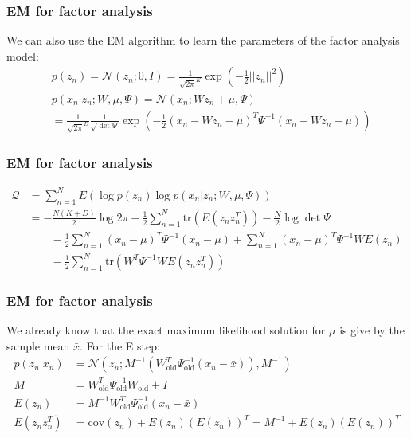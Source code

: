 \documentclass{beamer}
\begin{document}
\begin{frame}
    \frametitle{EM for factor analysis}
    We can also use the EM algorithm to learn the parameters of the factor analysis model:
    \begin{align*}
        &p(z_{n})=\mathcal{N}(z_{n};0,I)=\frac{1}{\sqrt{2\pi}^{K}}\exp(-\frac{1}{2}||z_{n}||^{2}) \\
        &p(x_{n}|z_{n};W,\mu,\Psi)=\mathcal{N}(x_{n};Wz_{n}+\mu,\Psi) \\
        &=\frac{1}{\sqrt{2\pi}^{D}}\frac{1}{\sqrt{\det\Psi}}\exp(-\frac{1}{2}(x_{n}-Wz_{n}-\mu)^{T}\Psi^{-1}(x_{n}-Wz_{n}-\mu))
    \end{align*}
\end{frame}

\begin{frame}
    \frametitle{EM for factor analysis}
    \begin{align*}
        \mathcal{Q}&=\sum_{n=1}^{N}E(\log{}p(z_{n})\log{}p(x_{n}|z_{n};W,\mu,\Psi)) \\
        &=-\frac{N(K+D)}{2}\log{}2\pi-\frac{1}{2}\sum_{n=1}^{N}\mathrm{tr}(E(z_{n}z_{n}^{T}))-\frac{N}{2}\log\det\Psi \\
        &\qquad-\frac{1}{2}\sum_{n=1}^{N}(x_{n}-\mu)^{T}\Psi^{-1}(x_{n}-\mu)+\sum_{n=1}^{N}(x_{n}-\mu)^{T}\Psi^{-1}WE(z_{n}) \\
        &\qquad-\frac{1}{2}\sum_{n=1}^{N}\mathrm{tr}(W^{T}\Psi^{-1}WE(z_{n}z_{n}^{T}))
    \end{align*}
\end{frame}

\begin{frame}
    \frametitle{EM for factor analysis}
    We already know that the exact maximum likelihood solution for $\mu$ is give by the sample mean $\bar{x}$. For the E step:
    \begin{align*}
        p(z_{n}|x_{n})&=\mathcal{N}(z_{n};M^{-1}(W^{T}_{\textrm{old}}\Psi^{-1}_{\textrm{old}}(x_{n}-\bar{x})),M^{-1}) \\
        M&=W^{T}_{\textrm{old}}\Psi^{-1}_{\textrm{old}}W_{\textrm{old}}+I \\
        E(z_{n})&=M^{-1}W^{T}_{\textrm{old}}\Psi^{-1}_{\textrm{old}}(x_{n}-\bar{x}) \\
        E(z_{n}z_{n}^{T})&=\mathrm{cov}(z_{n})+E(z_{n})(E(z_{n}))^{T}=M^{-1}+E(z_{n})(E(z_{n}))^{T}
    \end{align*}
\end{frame}
\end{document}
